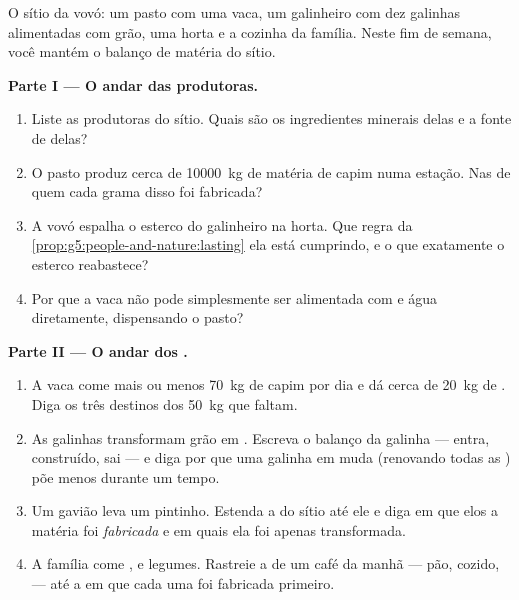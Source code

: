 \begin{problem}\label{pb:g6:matter-from-food:1}
O sítio da vovó: um pasto com uma vaca, um galinheiro com dez
galinhas alimentadas com grão, uma horta e a cozinha da família.
Neste fim de semana, você mantém o balanço de matéria do sítio.

\medskip\noindent\textbf{Parte I --- O andar das produtoras.}
\begin{enumerate}
  \item Liste as produtoras do sítio. Quais são os ingredientes
        minerais delas e a fonte de  delas?
  \item O pasto produz cerca de \qty{10000}{kg} de matéria de capim
        numa estação. Nas  de quem cada grama disso foi
        fabricada?
  \item A vovó espalha o esterco do galinheiro na horta. Que regra da
        \cref{prop:g5:people-and-nature:lasting} ela está cumprindo,
        e o que exatamente o esterco reabastece?
  \item Por que a vaca não pode simplesmente ser alimentada com  e água diretamente, dispensando o pasto?
\end{enumerate}

\medskip\noindent\textbf{Parte II --- O andar dos .}
\begin{enumerate}[resume]
  \item A vaca come mais ou menos \qty{70}{kg} de capim por dia e dá
        cerca de \qty{20}{kg} de . Diga os três destinos dos
        \qty{50}{kg} que faltam.
  \item As galinhas transformam grão em . Escreva o balanço da
        galinha --- entra, construído, sai --- e diga por que uma
        galinha em muda (renovando todas as ) põe menos 
        durante um tempo.
  \item Um gavião leva um pintinho. Estenda a  do
        sítio até ele e diga em que elos a matéria foi
        \emph{fabricada} e em quais ela foi apenas transformada.
  \item A família come ,  e legumes. Rastreie a  de um café da manhã --- pão,  cozido,  ---
        até a  em que cada uma foi fabricada primeiro.
\end{enumerate}


\end{problem}
